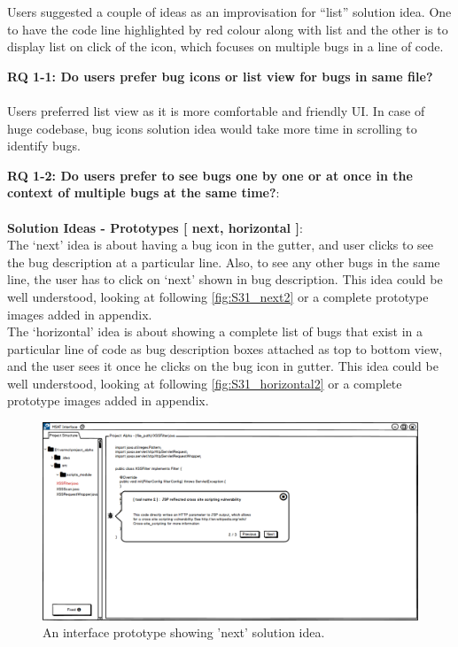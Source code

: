 Users suggested a couple of ideas as an improvisation for “list” solution idea. One to have the code line highlighted by red colour along with list and the other is to display list on click of the icon, which focuses on multiple bugs in a line of code. \\

\begin{myboxi}{{\textbf{RQ 1-1: Do users prefer bug icons or list view for bugs in same file?}}}
	\\ \\ Users preferred list view as it is more comfortable and friendly UI. In case of huge codebase, bug icons solution idea would take more time in scrolling to identify bugs. \\
\end{myboxi}


\textbf{RQ 1-2: Do users prefer to see bugs one by one or at once in the context of multiple bugs at the same time?}: \\ \\

\textbf{Solution Ideas - Prototypes [ next, horizontal ]}: \\

The ‘next’ idea is about having a bug icon in the gutter, and user clicks to see the bug description at a particular line. Also, to see any other bugs in the same line, the user has to click on ‘next’ shown in bug description. This idea could be well understood, looking at following \autoref{fig:S31_next2} or a complete prototype images added in appendix. \\

The ‘horizontal’ idea is about showing a complete list of bugs that exist in a particular line of code as bug description boxes attached as top to bottom view, and the user sees it once he clicks on the bug icon in gutter. This idea could be well understood, looking at following \autoref{fig:S31_horizontal2} or a complete prototype images added in appendix. \\


\begin{figure}[hbt!]
	\centering
	\includegraphics[width=\linewidth]{figures/solution_ideas_snaps/S31_next}
	\caption{An interface prototype showing 'next' solution idea.}
	\label{fig:S31_next2}
\end{figure} 

